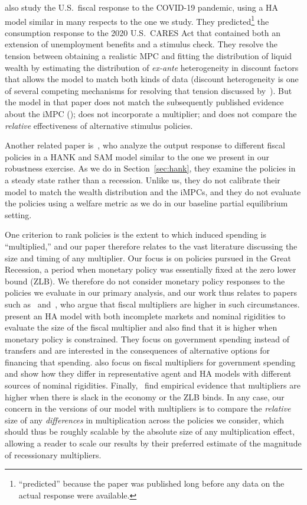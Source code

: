 \documentclass[\PathToRoot/\ProjectName]{subfiles}
\begin{document}
\cite{carroll2020modeling} also study the U.S.\ fiscal response to the COVID-19 pandemic, using a HA model similar in many respects to the one we study.  They predicted\footnote{``predicted'' because the paper was published long before any data on the actual response were available.} the consumption response to the 2020 U.S.\ CARES Act  that contained both an extension of unemployment benefits and a stimulus check.
They resolve the tension between obtaining a realistic MPC and fitting the distribution of liquid wealth by estimating the distribution of \textit{ex-ante} heterogeneity in discount factors that allows the model to match both kinds of data (discount heterogeneity is one of several competing mechanisms for resolving that tension discussed by~\cite{kaplanMPC2022}).
But the model in that paper does not match the subsequently published evidence about the iMPC (\cite{fagereng-mpc-2021}); does not incorporate a multiplier; and does not compare the \textit{relative} effectiveness of alternative stimulus policies.

Another related paper is~\cite{broer2025stimulus}, who analyze the output response to different fiscal policies in a HANK and SAM model similar to the one we present in our robustness exercise. As we do in Section~\ref{sec:hank}, they examine the policies in a steady state rather than a recession. Unlike us, they do not calibrate their model to match the wealth distribution and the iMPCs, and they do not evaluate the policies using a welfare metric as we do in our baseline partial equilibrium setting.

One criterion to rank policies is the extent to which induced spending is ``multiplied,'' and our paper therefore relates to the vast literature discussing the size and timing of any multiplier.
Our focus is on policies pursued in the Great Recession, a period when monetary policy was essentially fixed at the zero lower bound (ZLB).
We therefore do not consider monetary policy responses to the policies we evaluate in our primary analysis, and our work thus relates to papers such as~\cite{christiano2011government} and~\cite{eggertsson2011fiscal}, who argue that fiscal multipliers are higher in such circumstances.
\cite{hagedorn2019fiscal} present an HA model with both incomplete markets and nominal rigidities to evaluate the size of the fiscal multiplier and also find that it is higher when monetary policy is constrained.  They focus on government spending instead of transfers and are interested in the consequences of alternative options for financing that spending.
\cite{broer2023fiscalmultipliers} also focus on fiscal multipliers for government spending and show how they differ in representative agent and HA models with different sources of nominal rigidities.
Finally,~\cite{ramey2018government} find empirical evidence that multipliers are higher when there is slack in the economy or the ZLB binds.  
In any case, our concern in the versions of our model with multipliers is to compare the \textit{relative} size of any \textit{differences} in multiplication across the policies we consider, which should thus be roughly scalable by the absolute size of any multiplication effect, allowing a reader to scale our results by their preferred estimate of the magnitude of recessionary multipliers.
\end{document}
